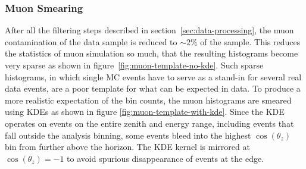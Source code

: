 \subsubsection{Muon Smearing}
\label{section:muon_kde}

After all the filtering steps described in section~\ref{sec:data-processing}, the muon contamination of the data sample is reduced to $\sim 2\%$ of the sample. This reduces the statistics of muon simulation so much, that the resulting histograms become very sparse as shown in figure~\ref{fig:muon-template-no-kde}. Such sparse histograms, in which single MC events have to serve as a stand-in for several real data events, are a poor template for what can be expected in data. To produce a more realistic expectation of the bin counts, the muon histograms are smeared using KDEs as shown in figure \ref{fig:muon-template-with-kde}. Since the KDE operates on events on the entire zenith and energy range, including events that fall outside the analysis binning, some events bleed into the highest $\cos(\theta_z)$ bin from further above the horizon. The KDE kernel is mirrored at $\cos(\theta_z) = -1$ to avoid spurious disappearance of events at the edge.

